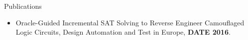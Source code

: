 \documentclass{resume} %
\begin{document}
\begin{rSection}{Publications}\itemsep 2pt
\begin{itemize}
\item Oracle-Guided Incremental SAT Solving to Reverse Engineer Camouflaged Logic Circuits, Design Automation and Test in Europe, \textbf{DATE 2016}.
\end{itemize}
\end{rSection}
\end{document}
